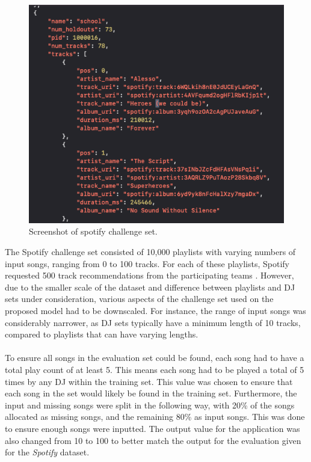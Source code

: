 \begin{figure}[H]
	\includegraphics[scale=0.5]{images/spotify_challenge_set}
	\centering
	\caption{Screenshot of spotify challenge set. \citep{aicrowd_aicrowd_2023}} 
\end{figure}

The Spotify challenge set consisted of 10,000 playlists with varying numbers of input songs, ranging from 0 to 100 tracks. For each of these playlists, Spotify requested 500 track recommendations from the participating teams \citep{aicrowd_aicrowd_2023}. However, due to the smaller scale of the dataset and difference between playlists and DJ sets under consideration, various aspects of the  challenge set used on the proposed model had to be downscaled. For instance, the range of input songs was considerably narrower, as DJ sets typically have a minimum length of 10 tracks, compared to playlists that can have varying lengths.
\\
\\
To ensure all songs in the evaluation set could be found, each song had to have a total play count of at least 5. This means each song had to be played a total of 5 times by any DJ within the training set. This value was chosen to ensure that each song in the set would likely be found in the training set. Furthermore, the input and missing songs were split in the following way, with 20\% of the songs allocated as missing songs, and the remaining 80\% as input songs. This was done to ensure enough songs were inputted. The output value for the application was also changed from 10 to 100 to better match the output for the evaluation given for the \textit{Spotify} dataset.

